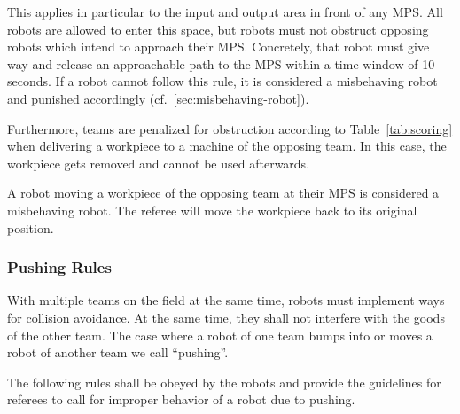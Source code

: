 \documentclass[12pt,twoside]{article}
\newcommand{\reftab}[1]{Table~\ref{#1}}
\begin{document}
This applies in particular to the input and output area in front of
any \ac{MPS}.  All robots are allowed to enter this space, but robots must
not obstruct opposing robots which intend to approach their
\ac{MPS}. Concretely, that robot must give way and release an approachable
path to the \ac{MPS} within a time window of 10 seconds. If a robot cannot
follow this rule, it is considered a misbehaving robot and punished accordingly
(cf.~\ref{sec:misbehaving-robot}).

Furthermore, teams are penalized for obstruction according to
\reftab{tab:scoring} when delivering a workpiece to a machine of the
opposing team. In this case, the workpiece gets removed and cannot be
used afterwards.

A robot moving a workpiece of the opposing team at their \ac{MPS} is
considered a misbehaving robot.
The referee will move the workpiece back to its original position.

\subsubsection{Pushing Rules}
\label{sec:pushing-rules}

With multiple teams on the field at the same time, robots must
implement ways for collision avoidance. At the same time, they shall
not interfere with the goods of the other team. The case where a robot
of one team bumps into or moves a robot of another team we
call ``pushing''.

The following rules shall be obeyed by the robots and provide the
guidelines for referees to call for improper behavior of a robot due
to pushing.
\end{document}
